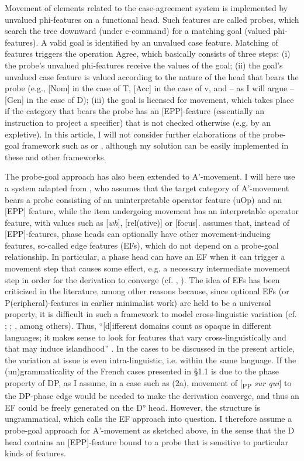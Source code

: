 \documentclass[output=paper]{langsci/langscibook}
\begin{document}
Movement of elements related to the case-agreement system is implemented by unvalued phi-features on a functional head. Such features are called probes, which search the tree downward (under c-command) for a matching goal (valued phi-features). A valid goal is identified by an unvalued case feature. Matching of features triggers the operation Agree, which basically consists of three steps: (i) the probe’s unvalued phi-features receive the values of the goal; (ii) the goal’s unvalued case feature is valued according to the nature of the head that bears the probe (e.g., [Nom] in the case of T, [Acc] in the case of v, and – as I will argue – [Gen] in the case of D); (iii) the goal is licensed for movement, which takes place if the category that bears the probe has an [EPP]-feature (essentially an instruction to project a specifier) that is not checked otherwise (e.g. by an expletive). In this article, I will not consider further elaborations of the probe-goal framework such as \citet{Pesetsky2007} or \citet{Zeijlstra2012}, although my solution can be easily implemented in these and other frameworks.

The probe-goal approach has also been extended to A’-movement. I will here use a system adapted from \citet[419ff.]{Radford2004}, who assumes that the target category of A’-movement bears a probe consisting of an uninterpretable operator feature (uOp) and an [EPP] feature, while the item undergoing movement has an interpretable operator feature, with values such as [\textit{wh}], [rel(ative)] or [focus]. \citet{Chomsky2007,Chomsky2008} assumes that, instead of [EPP]-features, phase heads can optionally have other movement-inducing features, so-called edge features (EFs), which do not depend on a probe-goal relationship. In particular, a phase head can have an EF when it can trigger a movement step that causes some effect, e.g. a necessary intermediate movement step in order for the derivation to converge (cf. \citealt[149]{Chomsky2008}, \citealt{Mueller2010deriving}). The idea of EFs has been criticized in the literature, among other reasons because, since optional EFs (or P(eripheral)-features in earlier minimalist work) are held to be a universal property, it is difficult in such a framework to model cross-linguistic variation (cf. \citealt{Ceplova2001}; \citealt{Boeckx2007}; \citealt{Boeckx2011}, among others). Thus, “[d]ifferent domains count as opaque in different languages; it makes sense to look for features that vary cross-linguistically and that may induce islandhood” \citep[4]{Boeckx2011}. In the cases to be discussed in the present article, the variation at issue is even intra-linguistic, i.e. within the same language. If the (un)grammaticality of the French cases presented in §1.1 is due to the phase property of DP, as I assume, in a case such as (2a), movement of [\textsubscript{PP} \textit{sur qui}] to the DP-phase edge would be needed to make the derivation converge, and thus an EF could be freely generated on the D° head. However, the structure is ungrammatical, which calls the EF approach into question. I therefore assume a probe-goal approach for A’-movement as sketched above, in the sense that the D head contains an [EPP]-feature bound to a probe that is sensitive to particular kinds of features.
\end{document}
